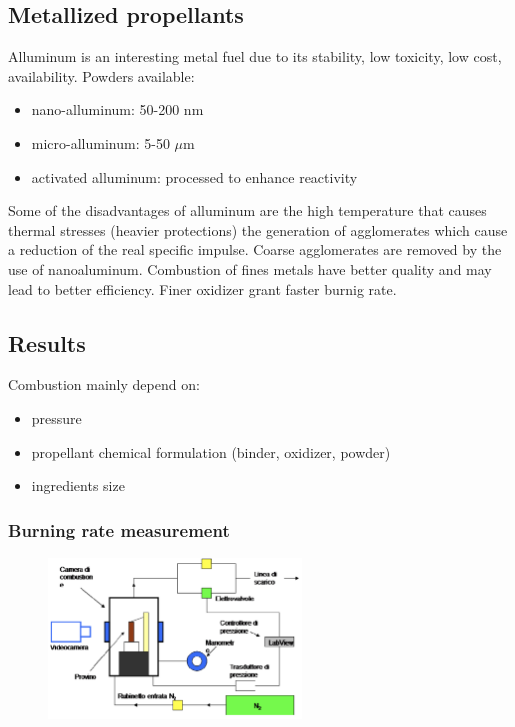 \documentclass[12pt]{article}
\begin{document}
\subsection{Metallized propellants}

Alluminum is an interesting metal fuel due to its stability, low toxicity, low cost, availability. Powders available:
\begin{itemize}
  \item nano-alluminum: 50-200 nm
  \item micro-alluminum: 5-50 $\mu$m
  \item activated alluminum: processed to enhance reactivity
\end{itemize}
 Some of the disadvantages of alluminum are the high temperature that causes thermal stresses (heavier protections) the generation of agglomerates which cause a reduction of the real specific impulse. Coarse agglomerates are removed by the use of nanoaluminum. Combustion of fines metals have better quality and may lead to better efficiency. Finer oxidizer grant faster burnig rate.

\subsection{Results}

 Combustion mainly depend on:
 \begin{itemize}
   \item pressure
   \item propellant chemical formulation (binder, oxidizer, powder)
   \item ingredients size
 \end{itemize}

\subsubsection{Burning rate measurement}

\begin{figure}[!ht]
\centering
\includegraphics[width=0.6\textwidth]{figures/expe.png}
\end{figure}
\end{document}
